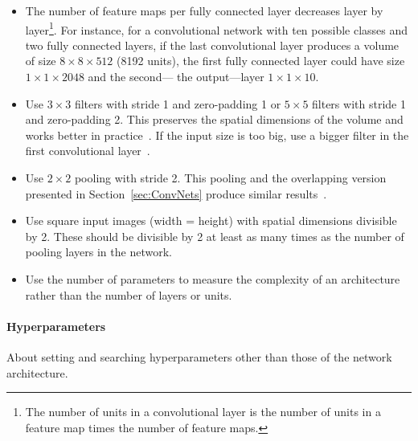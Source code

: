 \begin{itemize}
	\item The number of feature maps per fully connected layer decreases layer by layer\footnote{The number of units in a convolutional layer is the number of units in a feature map times the number of feature maps.}. For instance, for a convolutional network with ten possible classes and two fully connected layers, if the last convolutional layer produces a volume of size $8 \times 8 \times 512$ (8192 units), the first fully connected layer could have size $1 \times 1 \times 2048$ and the second--- the output---layer $1\times 1\times 10$.

	\item Use $3\times 3$ filters with stride 1 and zero-padding 1 or $5 \times 5$ filters with stride 1 and zero-padding 2. This preserves the spatial dimensions of the volume and works better in practice~\cite{Springenberg2014}. If the input size is too big, use a bigger filter in the first convolutional layer~\cite{Karpathy2015}.
	
	\item Use $2\times2$ pooling with stride 2. This pooling and the overlapping version presented in Section~\ref{sec:ConvNets} produce similar results~\cite{Krizhevsky2012}.
	\item Use square input images (width = height) with spatial dimensions divisible by 2. These should be divisible by 2 at least as many times as the number of pooling layers in the network.

	\item Use the number of parameters to measure the complexity of an architecture rather than the number of layers or units.
\end{itemize}



\paragraph{Hyperparameters} About setting and searching hyperparameters other than those of the network architecture.

